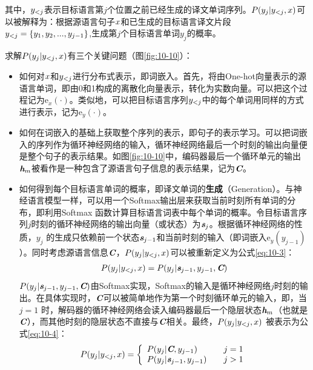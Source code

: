 \noindent 其中，$ {{y}}_{<j }$表示目标语言第$j$个位置之前已经生成的译文单词序列。$ {P} ( y_j | {{y}}_{<j }, {{x}})$可以被解释为：根据源语言句子${{x}} $和已生成的目标语言译文片段${{y}}_{<j }=\{ y_1, y_2,..., y_{j-1} \}$,生成第$j$个目标语言单词$y_j$的概率。

\vspace{0.5em}
\parinterval 求解${P}(y_j | {{y}}_{<j},{{x}})$有三个关键问题（图\ref{fig:10-10}）：

\begin{itemize}
\vspace{0.5em}
\item	如何对${{x}}$和${{y}}_{<j }$进行分布式表示，即词嵌入。首先，将由One-hot向量表示的源语言单词，即由0和1构成的离散化向量表示，转化为实数向量。可以把这个过程记为$\textrm{e}_x (\cdot)$。类似地，可以把目标语言序列${{y}}_{<j }$中的每个单词用同样的方式进行表示，记为$\textrm{e}_y (\cdot)$。
\vspace{0.5em}
\item	如何在词嵌入的基础上获取整个序列的表示，即句子的表示学习。可以把词嵌入的序列作为循环神经网络的输入，循环神经网络最后一个时刻的输出向量便是整个句子的表示结果。如图\ref{fig:10-10}中，编码器最后一个循环单元的输出$\textbf{\em h}_m$被看作是一种包含了源语言句子信息的表示结果，记为$\textbf{\em C}$。
\vspace{0.5em}
\item	如何得到每个目标语言单词的概率，即译文单词的{\small\sffamily\bfseries{生成}}（Generation）。与神经语言模型一样，可以用一个Softmax输出层来获取当前时刻所有单词的分布，即利用Softmax 函数计算目标语言词表中每个单词的概率。令目标语言序列$j$时刻的循环神经网络的输出向量（或状态）为$\textbf{\em s}_j$。根据循环神经网络的性质，$ y_j$ 的生成只依赖前一个状态$\textbf{\em s}_{j-1}$和当前时刻的输入（即词嵌入$\textrm{e}_y (y_{j-1})$）。同时考虑源语言信息$\textbf{\em C}$，${P}(y_j  | {{y}}_{<j},{{x}})$可以被重新定义为公式\eqref{eq:10-3}：
\begin{eqnarray}
{P} (y_j | {{y}}_{<j},{{x}}) = {P} ( {y_j | \textbf{\em s}_{j-1} ,y_{j-1},\textbf{\em C}} )
\label{eq:10-3}
\end{eqnarray}
${P}({y_j | \textbf{\em s}_{j-1} ,y_{j-1},\textbf{\em C}})$由Softmax实现，Softmax的输入是循环神经网络$j$时刻的输出。在具体实现时，$\textbf{\em C}$可以被简单地作为第一个时刻循环单元的输入，即，当$j=1$ 时，解码器的循环神经网络会读入编码器最后一个隐层状态$ \textbf{\em h}_m$（也就是$\textbf{\em C}$），而其他时刻的隐层状态不直接与$\textbf{\em C}$相关。最终，${P} (y_j | {{y}}_{<j},{{x}})$ 被表示为公式\eqref{eq:10-4}：
\begin{eqnarray}
{P} (y_j | {{y}}_{<j},{{x}}) =
 \left \{ \begin{array}{ll}
{P} (y_j |\textbf{\em C} ,y_{j-1}) &j=1 \\
{P} (y_j|\textbf{\em s}_{j-1},y_{j-1})  \quad &j>1
\end{array} \right .
\label{eq:10-4}
\end{eqnarray}
\vspace{0.5em}
\end{itemize}

